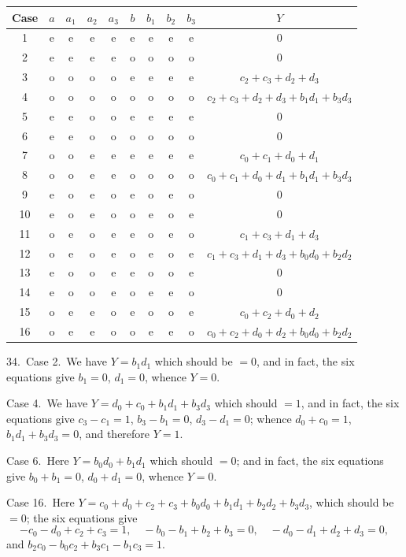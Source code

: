 \documentclass[11pt,a4paper]{article}
\theoremstyle{definition}
\begin{document}
\medskip
\begin{center}
\begin{tabular}{c|cccc|cccc|c}
Case & $a$ & $a_1$ & $a_2$ & $a_3$ & $b$ & $b_1$ & $b_2$ & $b_3$ & $Y$ \\
\hline
1 & e & e & e & e & e & e & e & e & 0 \\
2 & e & e & e & e & o & o & o & o & 0 \\
3 & o & o & o & o & e & e & e & e & $c_2 + c_3 + d_2 + d_3$ \\
4 & o & o & o & o & o & o & o & o & $c_2 + c_3 + d_2 + d_3 + b_1d_1 + b_3d_3$ \\
5 & e & e & o & o & e & e & e & e & 0 \\
6 & e & e & o & o & o & o & o & o & 0 \\
7 & o & o & e & e & e & e & e & e & $c_0 + c_1 + d_0 + d_1$ \\
8 & o & o & e & e & o & o & o & o & $c_0 + c_1 + d_0 + d_1 + b_1d_1 + b_3d_3$ \\
9 & e & o & e & o & e & o & e & o & 0 \\
10 & e & o & e & o & o & e & o & e & 0 \\
11 & o & e & o & e & e & o & e & o & $c_1 + c_3 + d_1 + d_3$ \\
12 & o & e & o & e & o & e & o & e & $c_1 + c_3 + d_1 + d_3 + b_0d_0 + b_2d_2$ \\
13 & e & o & o & e & e & o & o & e & 0 \\
14 & e & o & o & e & o & e & e & o & 0 \\
15 & o & e & e & o & e & o & o & e & $c_0 + c_2 + d_0 + d_2$ \\
16 & o & e & e & o & o & e & e & o & $c_0 + c_2 + d_0 + d_2 + b_0d_0 + b_2d_2$
\end{tabular}
\end{center}
\medskip

34.\ Case 2.\ We have $Y = b_1d_1$ which should be $= 0$, and in fact, the six equations give $b_1 = 0$, $d_1 = 0$, whence $Y = 0$.

Case 4.\ We have $Y = d_0 + c_0 + b_1d_1 + b_3d_3$ which should $= 1$, and in fact, the six equations give $c_3 - c_1 = 1$, $b_3 - b_1 = 0$, $d_3 - d_1 = 0$; whence $d_0 + c_0 = 1$, $b_1d_1 + b_3d_3 = 0$, and therefore $Y = 1$.

Case 6.\ Here $Y = b_0d_0 + b_1d_1$ which should $= 0$; and in fact, the six equations give $b_0 + b_1 = 0$, $d_0 + d_1 = 0$, whence $Y = 0$.

Case 16.\ Here $Y = c_0 + d_0 + c_2 + c_3 + b_0d_0 + b_1d_1 + b_2d_2 + b_3d_3$, which should be $= 0$; the six equations give
\[
-c_0 - d_0 + c_2 + c_3 = 1, \quad -b_0 - b_1 + b_2 + b_3 = 0, \quad -d_0 - d_1 + d_2 + d_3 = 0,
\]
and $b_2c_0 - b_0c_2 + b_3c_1 - b_1c_3 = 1$.
\end{document}
